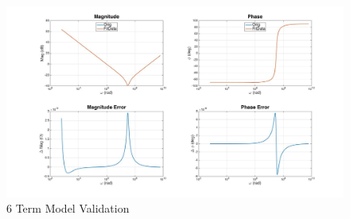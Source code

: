 \begin{figure}[ht!]
\includegraphics[keepaspectratio=true,width=6in]{./figures/regression/fullModel_test.jpg}
\centering
\caption{6 Term Model Validation}
\label{fig:fullModel_test}
\end{figure}
